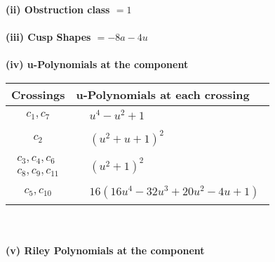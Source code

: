 \documentclass[1p]{elsarticle_modified}
\theoremstyle{definition}
\begin{document}
\flushleft \textbf{(ii) Obstruction class $= 1$}\\~\\
\flushleft \textbf{(iii) Cusp Shapes $= -8 a-4 u$}\\~\\
\newpage\renewcommand{\arraystretch}{1}
\flushleft \textbf{(iv) u-Polynomials at the component}\newline \\
\begin{tabular}{m{50pt}|m{274pt}}
Crossings & \hspace{64pt}u-Polynomials at each crossing \\
\hline $$\begin{aligned}c_{1},c_{7}\end{aligned}$$&$\begin{aligned}
&u^4- u^2+1
\end{aligned}$\\
\hline $$\begin{aligned}c_{2}\end{aligned}$$&$\begin{aligned}
&(u^2+u+1)^2
\end{aligned}$\\
\hline $$\begin{aligned}c_{3},c_{4},c_{6}\\c_{8},c_{9},c_{11}\end{aligned}$$&$\begin{aligned}
&(u^2+1)^2
\end{aligned}$\\
\hline $$\begin{aligned}c_{5},c_{10}\end{aligned}$$&$\begin{aligned}
&16(16 u^4-32 u^3+20 u^2-4 u+1)
\end{aligned}$\\
\hline
\end{tabular}\\~\\
\newpage\renewcommand{\arraystretch}{1}
\flushleft \textbf{(v) Riley Polynomials at the component}\newline \\
\end{document}

